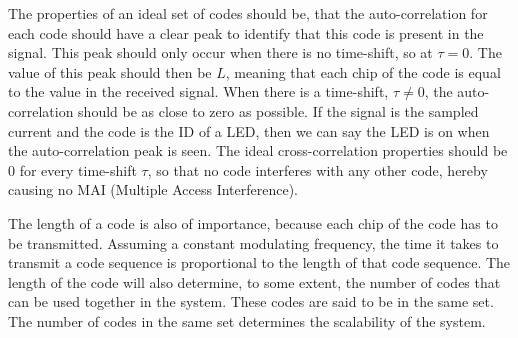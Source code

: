 



The properties of an ideal set of codes should be, that the auto-correlation for each code should have a clear peak to identify that this code is present in the signal.
This peak should only occur when there is no time-shift, so at $\tau = 0$.
The value of this peak should then be $L$, meaning that each chip of the code is equal to the value in the received signal.
When there is a time-shift, $\tau \neq 0$, the auto-correlation should be as close to zero as possible.
If the signal is the sampled current and the code is the ID of a LED, then we can say the LED is on when the auto-correlation peak is seen.
The ideal cross-correlation properties should be $0$ for every time-shift $\tau$, so that no code interferes with any other code, hereby causing no MAI (Multiple Access Interference).



The length of a code is also of importance, because each chip of the code has to be transmitted.
Assuming a constant modulating frequency, the time it takes to transmit a code sequence is proportional to the length of that code sequence.
The length of the code will also determine, to some extent, the number of codes that can be used together in the system.
These codes are said to be in the same set.
The number of codes in the same set determines the scalability of the system.




